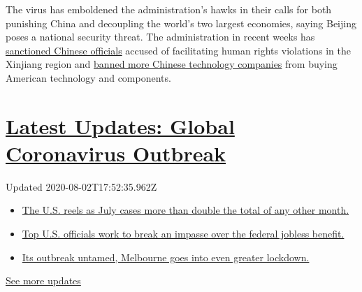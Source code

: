 The virus has emboldened the administration's hawks in their calls for
both punishing China and decoupling the world's two largest economies,
saying Beijing poses a national security threat. The administration in
recent weeks has
\href{https://www.nytimes3xbfgragh.onion/2020/07/31/us/politics/sanctions-china-xinjiang-uighurs.html}{sanctioned
Chinese officials} accused of facilitating human rights violations in
the Xinjiang region and
\href{https://www.nytimes3xbfgragh.onion/2020/07/20/business/economy/china-sanctions-uighurs-labor.html}{banned
more Chinese technology companies} from buying American technology and
components.

\hypertarget{latest-updates-global-coronavirus-outbreak}{%
\section{\texorpdfstring{\href{https://www.nytimes3xbfgragh.onion/2020/08/01/world/coronavirus-covid-19.html?action=click\&pgtype=Article\&state=default\&region=MAIN_CONTENT_1\&context=storylines_live_updates}{Latest
Updates: Global Coronavirus
Outbreak}}{Latest Updates: Global Coronavirus Outbreak}}\label{latest-updates-global-coronavirus-outbreak}}

Updated 2020-08-02T17:52:35.962Z

\begin{itemize}
\tightlist
\item
  \href{https://www.nytimes3xbfgragh.onion/2020/08/01/world/coronavirus-covid-19.html?action=click\&pgtype=Article\&state=default\&region=MAIN_CONTENT_1\&context=storylines_live_updates\#link-34047410}{The
  U.S. reels as July cases more than double the total of any other
  month.}
\item
  \href{https://www.nytimes3xbfgragh.onion/2020/08/01/world/coronavirus-covid-19.html?action=click\&pgtype=Article\&state=default\&region=MAIN_CONTENT_1\&context=storylines_live_updates\#link-780ec966}{Top
  U.S. officials work to break an impasse over the federal jobless
  benefit.}
\item
  \href{https://www.nytimes3xbfgragh.onion/2020/08/01/world/coronavirus-covid-19.html?action=click\&pgtype=Article\&state=default\&region=MAIN_CONTENT_1\&context=storylines_live_updates\#link-2bc8948}{Its
  outbreak untamed, Melbourne goes into even greater lockdown.}
\end{itemize}

\href{https://www.nytimes3xbfgragh.onion/2020/08/01/world/coronavirus-covid-19.html?action=click\&pgtype=Article\&state=default\&region=MAIN_CONTENT_1\&context=storylines_live_updates}{See
more updates}

